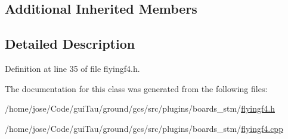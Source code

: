 \subsection*{Additional Inherited Members}


\subsection{Detailed Description}


Definition at line 35 of file flyingf4.\-h.



The documentation for this class was generated from the following files\-:\begin{DoxyCompactItemize}
\item 
/home/jose/\-Code/gui\-Tau/ground/gcs/src/plugins/boards\-\_\-stm/\hyperlink{flyingf4_8h}{flyingf4.\-h}\item 
/home/jose/\-Code/gui\-Tau/ground/gcs/src/plugins/boards\-\_\-stm/\hyperlink{flyingf4_8cpp}{flyingf4.\-cpp}\end{DoxyCompactItemize}
